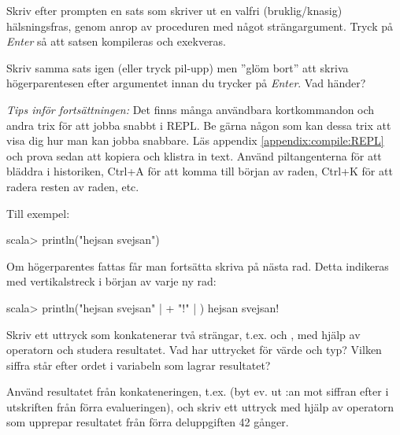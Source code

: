 \Subtask Skriv efter prompten  en sats som skriver ut en valfri (bruklig/knasig) hälsningsfras, genom anrop av proceduren  med något strängargument. Tryck på \textit{Enter} så att satsen kompileras och exekveras.

\Subtask Skriv samma sats igen (eller tryck pil-upp) men ''glöm bort'' att skriva högerparentesen efter argumentet innan du trycker på \textit{Enter}. Vad händer?

\begin{framed}
\noindent\emph{Tips inför fortsättningen:} Det finns många användbara kortkommandon och andra trix för att jobba snabbt i REPL. Be gärna någon som kan dessa trix att visa dig hur man kan jobba snabbare. Läs appendix \ref{appendix:compile:REPL} och prova sedan att kopiera och klistra in text. Använd piltangenterna för att bläddra i historiken, Ctrl+A för att komma till början av raden, Ctrl+K för att radera resten av raden, etc.
\end{framed}



\SOLUTION
\TaskSolved \what

\SubtaskSolved Till exempel:
\begin{REPLnonum}
scala> println("hejsan svejsan")
\end{REPLnonum}

\SubtaskSolved Om högerparentes fattas får man fortsätta skriva på nästa rad. Detta indikeras med vertikalstreck i början av varje ny rad:
\begin{REPLnonum}
scala> println("hejsan svejsan"
     | + "!"
     | )
hejsan svejsan!
\end{REPLnonum}

\QUESTEND




\QUESTBEGIN

\Task \what

\Subtask Skriv ett uttryck som konkatenerar två strängar, t.ex.  och , med hjälp av operatorn \code{+} och studera resultatet. Vad har uttrycket för värde och typ? Vilken siffra står efter ordet  i variabeln som lagrar resultatet?

\Subtask Använd resultatet från konkateneringen, t.ex.  (byt ev. ut :an mot siffran efter  i utskriften från förra evalueringen), och skriv ett uttryck med hjälp av operatorn \code{*} som upprepar resultatet från förra deluppgiften 42 gånger.


